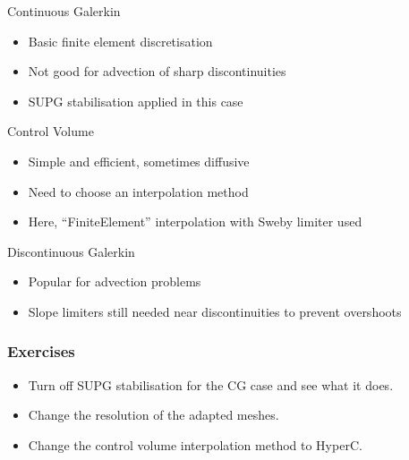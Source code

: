\begin{frame}
{\small
  \begin{block}{Continuous Galerkin}
    \begin{itemize}
      \item Basic finite element discretisation
      \item Not good for advection of sharp discontinuities
      \item SUPG stabilisation applied in this case
    \end{itemize}
  \end{block}
  \begin{block}{Control Volume}
    \begin{itemize}
      \item Simple and efficient, sometimes diffusive
      \item Need to choose an interpolation method
      \item Here, ``FiniteElement'' interpolation with Sweby limiter used
    \end{itemize}
  \end{block}
  \begin{block}{Discontinuous Galerkin}
    \begin{itemize}
      \item Popular for advection problems
      \item Slope limiters still needed near discontinuities to prevent overshoots
    \end{itemize}
  \end{block}
}
\end{frame}

\begin{frame}
  \frametitle{Exercises}
  \begin{itemize}
    \item Turn off SUPG stabilisation for the CG case and see what it does.
    \item Change the resolution of the adapted meshes.
    \item Change the control volume interpolation method to HyperC.
  \end{itemize}
\end{frame}

%
